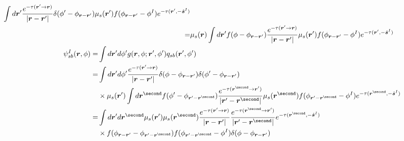 \documentclass [10pt,letterpaper]{article}
\newcommand{\unitvectorsym}[1]{\hat{\vectorsym{#1}}}
\begin{document}
\begin{subequations}
\begin{align}
\begin{split}
			\int d\vectorsym{r}^\prime
			\frac
			{e^{-\tau(\vectorsym{r}^\prime\to\vectorsym{r})}}
			{\lvert \vectorsym{r}-\vectorsym{r}^\prime \rvert}
			\delta(\phi^\prime-\phi_{\vectorsym{r}-\vectorsym{r}^\prime})
			\mu_s(\vectorsym{r}^\prime)
			f(\phi_{\vectorsym{r}-\vectorsym{r}^\prime}-\phi^I)
			e^{-\tau(\vectorsym{r}^\prime,-\unitvectorsym{s}^I)} 
			\\
			=& 
			\mu_s(\vectorsym{r})
			\int d\vectorsym{r}^\prime
			f(\phi-\phi_{\vectorsym{r}-\vectorsym{r}^\prime})
			\frac
			{e^{-\tau(\vectorsym{r}^\prime\to\vectorsym{r})}}
			{\lvert \vectorsym{r}-\vectorsym{r}^\prime \rvert}
			\mu_s(\vectorsym{r}^\prime)
			f(\phi_{\vectorsym{r}-\vectorsym{r}^\prime}-\phi^I)
			e^{-\tau(\vectorsym{r}^\prime,-\unitvectorsym{s}^I)} 
		\end{split}
		\label{eq:result-qsb-2d}
			\\
		\begin{split}
			\psi_{sb}^I(\vectorsym{r},\phi)
			=&
			\int d\vectorsym{r}^\prime d\phi^\prime
			g(\vectorsym{r},\phi;\vectorsym{r}^\prime,\phi^\prime)
			q_{sb}(\vectorsym{r}^\prime,\phi^\prime)
			\\
			=& 
			\int d\vectorsym{r}^\prime d\phi^\prime
			\frac
			{e^{-\tau(\vectorsym{r}^\prime\to\vectorsym{r})}}
			{\lvert \vectorsym{r}-\vectorsym{r}^\prime \rvert}
			\delta(\phi-\phi_{\vectorsym{r}-\vectorsym{r}^\prime})
			\delta(\phi^\prime-\phi_{\vectorsym{r}-\vectorsym{r}^\prime})
			\\
			&
			\times
			\mu_s(\vectorsym{r}^\prime)
			\int d\vectorsym{r}^\second
			f(\phi^\prime-\phi_{\vectorsym{r}^\prime-\vectorsym{r}^\second})
			\frac
			{e^{-\tau(\vectorsym{r}^\second\to\vectorsym{r}^\prime)}}
			{\lvert \vectorsym{r}^\prime-\vectorsym{r}^\second \rvert}
			\mu_s(\vectorsym{r}^\second)
			f(\phi_{\vectorsym{r}^\prime-\vectorsym{r}^\second}-\phi^I)
			e^{-\tau(\vectorsym{r}^\second,-\unitvectorsym{s}^I)} 
			\\
			=& 
			\int d\vectorsym{r}^\prime d\vectorsym{r}^\second
			\mu_s(\vectorsym{r}^\prime)
			\mu_s(\vectorsym{r}^\second)
			\frac
			{e^{-\tau(\vectorsym{r}^\prime\to\vectorsym{r})}}
			{\lvert \vectorsym{r}-\vectorsym{r}^\prime \rvert}
			\frac
			{e^{-\tau(\vectorsym{r}^\second\to\vectorsym{r}^\prime)}}
			{\lvert \vectorsym{r}^\prime-\vectorsym{r}^\second \rvert}
			e^{-\tau(\vectorsym{r}^\second,-\unitvectorsym{s}^I)} 
			\\
			&
			\times
			f(\phi_{\vectorsym{r}-\vectorsym{r}^\prime}-\phi_{\vectorsym{r}^\prime-\vectorsym{r}^\second})
			f(\phi_{\vectorsym{r}^\prime-\vectorsym{r}^\second}-\phi^I)
			\delta(\phi-\phi_{\vectorsym{r}-\vectorsym{r}^\prime})
		\end{split}
		\label{eq:result-psisbI-2d}
	\end{align}
\end{subequations}
\end{document}
